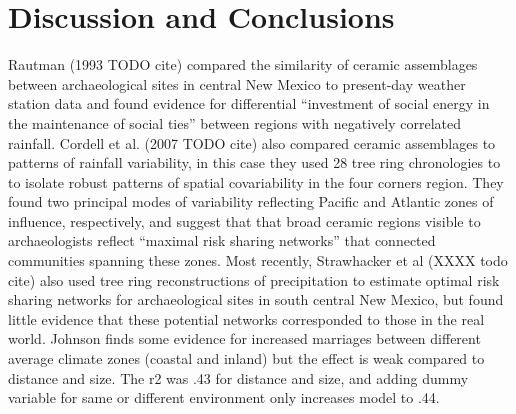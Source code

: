 \documentclass[fleqn,10pt]{wlscirep}
\begin{document}


\section*{Discussion and Conclusions}
Rautman (1993 TODO cite) compared the similarity of ceramic assemblages between archaeological sites in central New Mexico to present-day weather station data and found evidence for differential ``investment of social energy in the maintenance of social ties'' between regions with negatively correlated rainfall. Cordell et al. (2007 TODO cite) also compared ceramic assemblages to patterns of rainfall variability, in this case they used 28 tree ring chronologies to to isolate robust patterns of spatial covariability in the four corners region. They found two principal modes of variability reflecting Pacific and Atlantic zones of influence, respectively, and suggest that that broad ceramic regions visible to archaeologists reflect ``maximal risk sharing networks'' that connected communities spanning these zones. Most recently, Strawhacker et al (XXXX todo cite) also used tree ring reconstructions of precipitation to estimate optimal risk sharing networks for archaeological sites in south central New Mexico, but found little evidence that these potential networks corresponded to those in the real world. Johnson finds some evidence for increased marriages between different average climate zones (coastal and inland) but the effect is weak compared to distance and  size. The r2 was .43 for distance and size, and adding dummy variable for same or different environment only increases model to .44.
\end{document}
